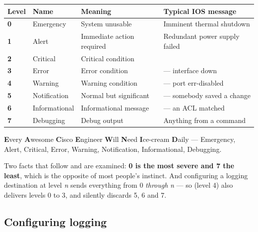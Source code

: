 \begin{longtable}{@{}L{1.3cm}L{2.9cm}L{5.3cm}L{5.4cm}@{}}
\toprule
{}
\textbf{Level} & \textbf{Name} & \textbf{Meaning} & \textbf{Typical IOS message} \\
\midrule
\endhead
{}
\textbf{0} & Emergency & System unusable & Imminent thermal shutdown \\
\textbf{1} & Alert & Immediate action required & Redundant power supply failed \\
\textbf{2} & Critical & Critical condition &
 \\
\textbf{3} & Error & Error condition &
 --- interface down \\
\textbf{4} & Warning & Warning condition &
 --- port err-disabled \\
\textbf{5} & Notification & Normal but significant &
 --- somebody saved a change \\
\textbf{6} & Informational & Informational message &
 --- an ACL matched \\
\textbf{7} & Debugging & Debug output &
Anything from a  command \\
\bottomrule
\end{longtable}

\begin{conceptbox}
\textbf{E}very \textbf{A}wesome \textbf{C}isco \textbf{E}ngineer \textbf{W}ill
\textbf{N}eed \textbf{I}ce-cream \textbf{D}aily --- Emergency, Alert, Critical,
Error, Warning, Notification, Informational, Debugging.

Two facts that follow and are examined: \textbf{0 is the most severe and 7 the
least}, which is the opposite of most people's instinct. And configuring a
logging destination at level \emph{n} sends everything from 0 \emph{through}
\emph{n} --- so  (level 4) also delivers levels 0
to 3, and silently discards 5, 6 and 7.
\end{conceptbox}

\subsection{Configuring logging}

